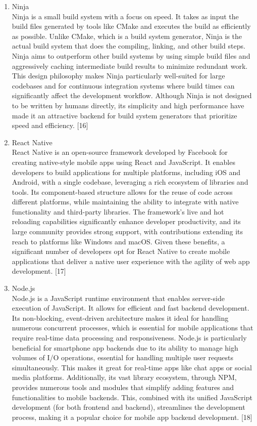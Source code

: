 \documentclass[conference]{IEEEtran}
\begin{document}
\begin{enumerate}[label=\arabic*.]
\begin{enumerate}[label=\alph*.]
\item Ninja\\
Ninja is a small build system with a focus on speed. It takes as input the build files generated by tools like CMake and executes the build as efficiently as possible. Unlike CMake, which is a build system generator, Ninja is the actual build system that does the compiling, linking, and other build steps. Ninja aims to outperform other build systems by using simple build files and aggressively caching intermediate build results to minimize redundant work. This design philosophy makes Ninja particularly well-suited for large codebases and for continuous integration systems where build times can significantly affect the development workflow. Although Ninja is not designed to be written by humans directly, its simplicity and high performance have made it an attractive backend for build system generators that prioritize speed and efficiency. [16]\\
\item React Native\\
React Native is an open-source framework developed by Facebook for creating native-style mobile apps using React and JavaScript. It enables developers to build applications for multiple platforms, including iOS and Android, with a single codebase, leveraging a rich ecosystem of libraries and tools. Its component-based structure allows for the reuse of code across different platforms, while maintaining the ability to integrate with native functionality and third-party libraries. The framework's live and hot reloading capabilities significantly enhance developer productivity, and its large community provides strong support, with contributions extending its reach to platforms like Windows and macOS. Given these benefits, a significant number of developers opt for React Native to create mobile applications that deliver a native user experience with the agility of web app development. [17]\\
\item Node.js\\
Node.js is a JavaScript runtime environment that enables server-side execution of JavaScript. It allows for efficient and fast backend development. Its non-blocking, event-driven architecture makes it ideal for handling numerous concurrent processes, which is essential for mobile applications that require real-time data processing and responsiveness. Node.js is particularly beneficial for smartphone app backends due to its ability to manage high volumes of I/O operations, essential for handling multiple user requests simultaneously. This makes it great for real-time apps like chat apps or social media platforms. Additionally, its vast library ecosystem, through NPM, provides numerous tools and modules that simplify adding features and functionalities to mobile backends. This, combined with its unified JavaScript development (for both frontend and backend), streamlines the development process, making it a popular choice for mobile app backend development. [18]\\
\end{enumerate}
\end{enumerate}
\end{document}
